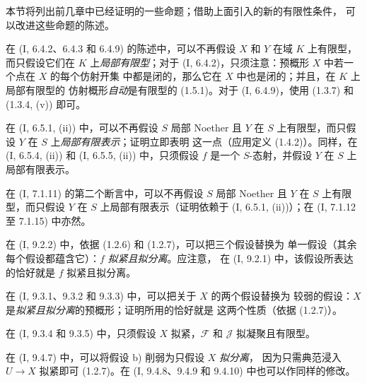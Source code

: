 本节将列出前几章中已经证明的一些命题；借助上面引入的新的有限性条件，
可以改进这些命题的陈述。

\begin{env}[1.7.1]
\label{IV.1.7.1-fr}
在 (I, 6.4.2、6.4.3 和 6.4.9) 的陈述中，可以不再假设 $X$ 和 $Y$
在域 $K$ 上有限型，而只假设它们在 $K$ 上\emph{局部有限型}；对于
(I, 6.4.2)，只须注意：预概形 $X$ 中若一个点在 $X$ 的每个仿射开集
中都是闭的，那么它在 $X$ 中也是闭的；并且，在 $K$ 上局部有限型的
仿射概形\emph{自动}是有限型的 (1.5.1)。对于 (I, 6.4.9)，使用 (1.3.7)
和 (1.3.4, (v)) 即可。
\end{env}

\begin{env}[1.7.2]
\label{IV.1.7.2-fr}
在 (I, 6.5.1, (ii)) 中，可以不再假设 $S$ 局部 Noether 且 $Y$ 在
$S$ 上有限型，而只假设 $Y$ 在 $S$ 上\emph{局部有限表示}；证明立即表明
这一点（应用定义 (1.4.2)）。同样，在 (I, 6.5.4, (ii)) 和
(I, 6.5.5, (ii)) 中，只须假设 $f$ 是一个 $S$-态射，并假设 $Y$ 在
$S$ 上局部有限表示。
\end{env}

\begin{env}[1.7.3]
\label{IV.1.7.3-fr}
在 (I, 7.1.11) 的第二个断言中，可以不再假设 $S$ 局部 Noether 且
$Y$ 在 $S$ 上有限型，而只假设 $Y$ 在 $S$ 上局部有限表示（证明依赖于
(I, 6.5.1, (ii))）；在 (I, 7.1.12 至 7.1.15) 中亦然。
\end{env}

\begin{env}[1.7.4]
\label{IV.1.7.4-fr}
在 (I, 9.2.2) 中，依据 (1.2.6) 和 (1.2.7)，可以把三个假设替换为
单一假设（其余每个假设都蕴含它）：$f$ \emph{拟紧且拟分离}。应注意，
在 (I, 9.2.1) 中，该假设所表达的恰好就是 $f$ 拟紧且拟分离。
\end{env}

\begin{env}[1.7.5]
\label{IV.1.7.5-fr}
在 (I, 9.3.1、9.3.2 和 9.3.3) 中，可以把关于 $X$ 的两个假设替换为
较弱的假设：$X$ 是\emph{拟紧且拟分离}的预概形；证明所用的恰好就是
这两个性质（依据 (1.2.7)）。
\end{env}

\begin{env}[1.7.6]
\label{IV.1.7.6-fr}
在 (I, 9.3.4 和 9.3.5) 中，只须假设 $X$ 拟紧，$\mathcal F$ 和
$\mathcal J$ 拟凝聚且有限型。
\end{env}

\begin{env}[1.7.7]
\label{IV.1.7.7-fr}
在 (I, 9.4.7) 中，可以将假设 b) 削弱为只假设 $X$ \emph{拟分离}，
因为只需典范浸入 $U\to X$ 拟紧即可 (1.2.7)。在 (I, 9.4.8、9.4.9
和 9.4.10) 中也可以作同样的修改。
\end{env}

